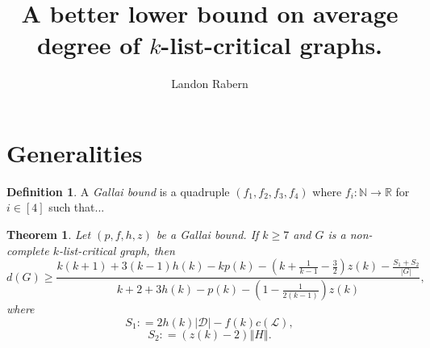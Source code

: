 \documentclass[10pt]{article}
\title{A better lower bound on average degree of $k$-list-critical graphs.}
\author{Landon Rabern}
\theoremstyle{plain}
\newtheorem{thm}{Theorem}[section]
\theoremstyle{definition}
\newtheorem{defn}{Definition}
\theoremstyle{remark}
\newcommand{\fancy}[1]{\mathcal{#1}}
\newcommand{\IN}{\mathbb{N}}
\newcommand{\IR}{\mathbb{R}}
\newcommand{\D}{\fancy{D}}
\renewcommand{\L}{\fancy{L}}
\newcommand{\card}[1]{\left|#1\right|}
\newcommand{\size}[1]{\left\Vert#1\right\Vert}
\newcommand{\func}[3]{#1\colon #2 \rightarrow #3}
\newcommand{\irange}[1]{\left[#1\right]}
\newcommand{\parens}[1]{\left( #1 \right)}
\newcommand{\DefinedAs}{\mathrel{\mathop:}=}
\def\D{\fancy{D}}
\begin{document}
\maketitle

\section{Generalities}
\begin{defn}
A \emph{Gallai bound} is a quadruple $\parens{f_1, f_2, f_3, f_4}$ where $\func{f_i}{\IN}{\IR}$ for $i \in \irange{4}$ such that...
\end{defn}
\begin{thm}
	Let $\parens{p,f,h,z}$ be a Gallai bound.  If $k \ge 7$ and $G$ is a non-complete $k$-list-critical graph, then 
	\[d(G) \ge \frac{k(k+1) + 3(k-1)h(k) - kp(k) - \parens{k + \frac{1}{k-1} - \frac32}z(k) - \frac{S_1 + S_2}{\card{G}}}{k+2 + 3h(k) - p(k) - \parens{1 - \frac{1}{2(k-1)}}z(k)},\]
	where
	\[S_1 \DefinedAs 2h(k)\card{\D} - f(k)c(\L),\]
	\[S_2 \DefinedAs (z(k) - 2)\size{H}.\]
\end{thm}
\end{document}
